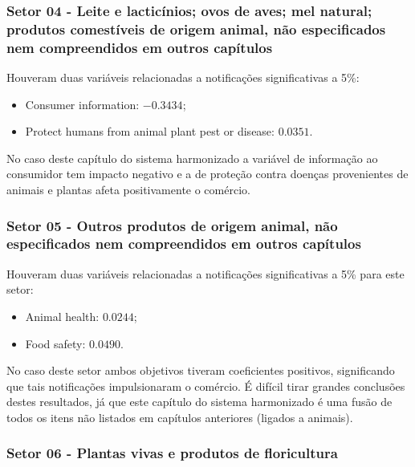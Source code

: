 \newpage

\subsubsection{Setor 04 - Leite e lacticínios; ovos de aves; mel natural; produtos comestíveis de origem animal, não especificados nem compreendidos em outros capítulos}


 

Houveram duas variáveis relacionadas a notificações significativas a 5\%:

\begin{itemize}
    \item Consumer information: $-0.3434$;
    \item Protect humans from animal plant pest or disease: $0.0351$.
\end{itemize}

No caso deste capítulo do sistema harmonizado a variável de informação ao consumidor tem impacto negativo e a de proteção contra doenças provenientes de animais e plantas afeta positivamente o comércio.

\newpage


\subsubsection{Setor 05 - Outros produtos de origem animal, não especificados nem compreendidos em outros capítulos}


 

Houveram duas variáveis relacionadas a notificações significativas a 5\% para este setor:

\begin{itemize}
    \item Animal health: $0.0244$;
    \item Food safety: $0.0490$.
\end{itemize}

No caso deste setor ambos objetivos tiveram coeficientes positivos, significando que tais notificações impulsionaram o comércio. É difícil tirar grandes conclusões destes resultados, já que este capítulo do sistema harmonizado é uma fusão de todos os itens não listados em capítulos anteriores (ligados a animais).

\newpage


\subsubsection{Setor 06 - Plantas vivas e produtos de floricultura}


